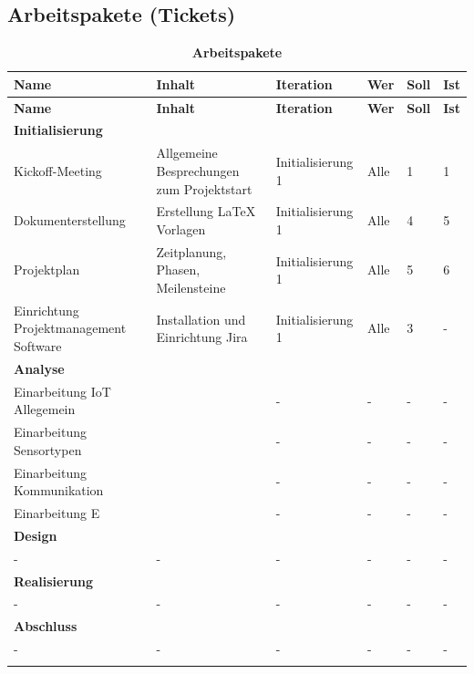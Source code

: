 \begin{landscape}
\subsection{Arbeitspakete (Tickets)}
\begin{longtable}{ p{5.5cm} p{8cm} l l p{1cm} p{1cm} }

\hline 
\multicolumn{1}{p{5.5cm}}{\textbf{Name}} & \multicolumn{1}{p{8cm}}{\textbf{Inhalt}} & \multicolumn{1}{l}{\textbf{Iteration}} & \multicolumn{1}{l}{\textbf{Wer}} & \multicolumn{1}{p{1cm}}{\textbf{Soll}} & \multicolumn{1}{p{1cm}}{\textbf{Ist}} \\ \hline 
\endfirsthead


\hline 
\multicolumn{1}{p{5.5cm}}{\textbf{Name}} & \multicolumn{1}{p{8cm}}{\textbf{Inhalt}} & \multicolumn{1}{l}{\textbf{Iteration}} & \multicolumn{1}{l}{\textbf{Wer}} & \multicolumn{1}{p{1cm}}{\textbf{Soll}} & \multicolumn{1}{p{1cm}}{\textbf{Ist}} \\ \hline 
\endhead


\textbf{Initialisierung}&&&&\\ \addlinespace
Kickoff-Meeting & Allgemeine Besprechungen zum Projektstart & Initialisierung 1 & Alle & 1 & 1 \\ \addlinespace
Dokumenterstellung & Erstellung \LaTeX{} Vorlagen & Initialisierung 1 & Alle & 4 & 5 \\ \addlinespace
Projektplan & Zeitplanung, Phasen, Meilensteine & Initialisierung 1 & Alle & 5 & 6 \\ \addlinespace
Einrichtung Projektmanagement Software & Installation und Einrichtung Jira & Initialisierung 1 & Alle & 3 & - \\ \addlinespace




\textbf{Analyse}&&&&\\ \addlinespace
Einarbeitung IoT Allegemein &  & - & - & - & -\\ \addlinespace
Einarbeitung Sensortypen &  & - & - & - & -\\ \addlinespace
Einarbeitung Kommunikation &  & - & - & - & -\\ \addlinespace
Einarbeitung E &  & - & - & - & -\\ \addlinespace





\textbf{Design}&&&&\\ \addlinespace
- & - & - & - & - & -\\ \addlinespace
\textbf{Realisierung}&&&&\\ \addlinespace
- & - & - & - & - & -\\ \addlinespace
\textbf{Abschluss}&&&&\\ \addlinespace
- & - & - & - & - & -\\ \addlinespace


 \addlinespace


\hline\caption{\textbf{Arbeitspakete}}
\end{longtable}
\end{landscape}

